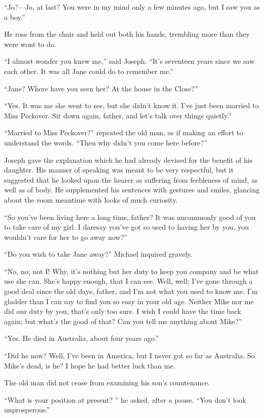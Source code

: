 ``Jo?---Jo, at last? You were in my mind only a few minutes ago, but I
saw you as a boy.''

He rose from the chair and held out both his hands, trembling more than
they were wont to do.

``I almost wonder you knew me,'' said Joseph. ``It's seventeen years
since we saw each other. It was all Jane could do to remember me.''

``Jane? Where have you seen her? At the house in the Close?''

``Yes. It was me she went to see, but she didn't know it. I've just been
married to Miss Peckover. Sit down again, father, and let's talk over
things quietly.''

``Married to Miss Peckover?'' repeated the old man, as if making an
effort to understand {}the words. ``Then why didn't you come here
before?''

Joseph gave the explanation which he had already devised for the benefit
of his daughter. His manner of speaking was meant to be very respectful,
but it suggested that he looked upon the hearer as suffering from
feebleness of mind, as well as of body. He supplemented his sentences
with gestures and smiles, glancing about the room meantime with looks of
much curiosity.

``So you've been living here a long time, father? It was uncommonly good
of you to take care of my girl. I daresay you've got so used to having
her by you, you wouldn't care for her to go away now?''

``Do you wish to take Jane away?'' Michael inquired gravely.

``No, no; not I! Why, it's nothing but her duty to keep you company and
be what use she can. She's happy enough, that I can see. Well, well;
I've gone through a good deal since the old days, father, and I'm not
what you used to know me. I'm gladder {}than I can say to find you so
easy in your old age. Neither Mike nor me did our duty by you, that's
only too sure. I wish I could have the time back again; but what's the
good of that? Can you tell me anything about Mike?''

``Yes. He died in Australia, about four years ago.''

``Did he now? Well, I've been in America, but I never got so far as
Australia. So Mike's dead, is he? I hope he had better luck than me.

The old man did not cease from examining his son's countenance.

``What is your position at present? '' he asked, after a pause. ``You
don't look unprosperous.''

